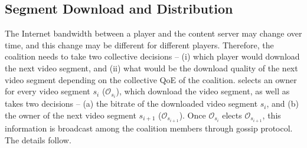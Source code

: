 \subsection{Segment Download and Distribution}
The Internet bandwidth between a player and the content server may change over time, and this change may be different for different {\our} players. Therefore, the coalition needs to take two collective decisions -- (i) which player would download the next video segment, and (ii) what would be the download quality of the next video segment depending on the collective QoE of the coalition. {\our} selects an owner for every video segment $s_i$ ($\mathcal{O}_{s_i}$), which download the video segment, as well as takes two decisions -- (a) the bitrate of the downloaded video segment $s_i$, and (b) the owner of the next video segment $s_{i+1}$ ($\mathcal{O}_{s_{i+1}}$). Once $\mathcal{O}_{s_i}$ elects $\mathcal{O}_{s_{i+1}}$, this information is broadcast among the coalition members through gossip protocol. The details follow. 
